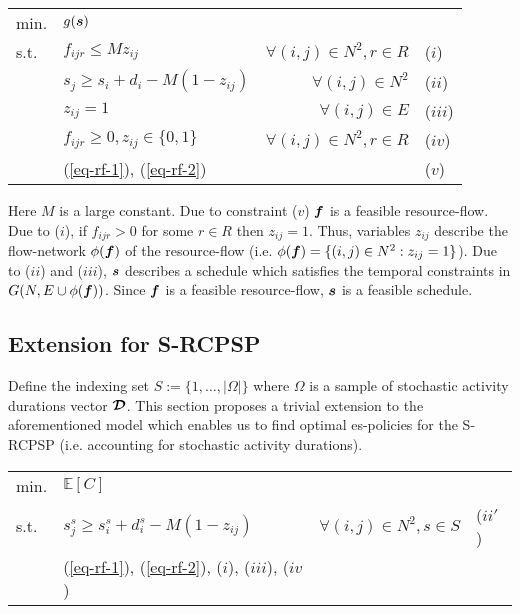    	\begin{center}
  	\begin{tabular}{ l l  r  l}
  	min.	&	$g(\boldsymbol{s})$									&	& \\
  	s.t.	&	$f_{ijr} \leq M z_{ij}$					&	$\forall (i,j) \in N^2, r\in R$ & ($i$) \\
  			&	$s_j \geq s_i + d_i - M(1-z_{ij})$		&	$\forall (i,j) \in N^2$	& ($ii$) \\
  			&	$z_{ij} = 1$							&	$\forall (i,j) \in E$	& ($iii$) \\
  			&	$f_{ijr} \geq 0, z_{ij} \in \{0,1\}$	&	$\forall (i,j) \in N^2, r\in R$ & ($iv$) \\
  			&	(\ref{eq-rf-1}), (\ref{eq-rf-2})		& & ($v$)
  	\end{tabular}
  	\end{center}
  	
  	Here $M$ is a large constant.
  	Due to constraint ($v$) $\boldsymbol{f}$ is a feasible resource-flow.
  	Due to ($i$), if $f_{ijr} > 0$ for some $r \in R$ then $z_{ij} = 1$.
  	Thus, variables $z_{ij}$ describe the flow-network $\phi(\boldsymbol{f})$ of the resource-flow
  	(i.e. $\phi(\boldsymbol{f}) = \{(i,j)\in N^2 : z_{ij}=1\}$).
  	Due to ($ii$) and ($iii$), $\boldsymbol{s}$ describes a schedule which 
  	satisfies the temporal constraints in $G(N,E\cup \phi(\boldsymbol{f}))$.
  	Since $\boldsymbol{f}$ is a feasible resource-flow, $\boldsymbol{s}$ is a feasible schedule.
  	
  	\subsection{Extension for S-RCPSP}
  	
  	Define the indexing set $S := \{1,\ldots,|\Omega|\}$
  	where $\Omega$ is a sample of stochastic activity durations vector $\boldsymbol{\mathcal{D}}$.
  	This section proposes a trivial extension to the aforementioned model
  	which enables us to find optimal es-policies for the S-RCPSP
  	(i.e. accounting for stochastic activity durations).
  	
  	\begin{center}
  	\begin{tabular}{ l l  r  l}
  	min.	&	$\mathbb{E}[C]$		&	& \\
  	s.t.	&	$s^s_j \geq s^s_i + d^s_i - M(1-z_{ij})$	&	$\forall (i,j) \in N^2, s\in S$ & ($ii'$) \\
  			&	(\ref{eq-rf-1}), (\ref{eq-rf-2}), ($i$), ($iii$), ($iv$)		& &	
  	\end{tabular}
  	\end{center}
  	
